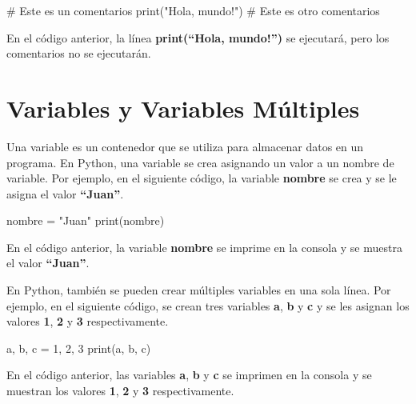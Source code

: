 \documentclass[
  a4paper,
  DIV=11,
  numbers=noendperiod,
  onepage,
  openany]{scrreprt}
\newenvironment{Shaded}{\begin{snugshade}}{\end{snugshade}}
\newcommand{\BuiltInTok}[1]{\textcolor[rgb]{0.00,0.23,0.31}{#1}}
\newcommand{\CommentTok}[1]{\textcolor[rgb]{0.37,0.37,0.37}{#1}}
\newcommand{\DecValTok}[1]{\textcolor[rgb]{0.68,0.00,0.00}{#1}}
\newcommand{\NormalTok}[1]{\textcolor[rgb]{0.00,0.23,0.31}{#1}}
\newcommand{\OperatorTok}[1]{\textcolor[rgb]{0.37,0.37,0.37}{#1}}
\newcommand{\StringTok}[1]{\textcolor[rgb]{0.13,0.47,0.30}{#1}}
\begin{document}
\begin{Shaded}
\begin{Highlighting}[]
\CommentTok{\# Este es un comentarios}
\BuiltInTok{print}\NormalTok{(}\StringTok{"Hola, mundo!"}\NormalTok{) }\CommentTok{\# Este es otro comentarios}
\end{Highlighting}
\end{Shaded}

En el código anterior, la línea \textbf{print(``Hola, mundo!'')} se
ejecutará, pero los comentarios no se ejecutarán.

\section{Variables y Variables
Múltiples}\label{variables-y-variables-muxfaltiples}

Una variable es un contenedor que se utiliza para almacenar datos en un
programa. En Python, una variable se crea asignando un valor a un nombre
de variable. Por ejemplo, en el siguiente código, la variable
\textbf{nombre} se crea y se le asigna el valor \textbf{``Juan''}.

\begin{Shaded}
\begin{Highlighting}[]
\NormalTok{nombre }\OperatorTok{=} \StringTok{"Juan"}
\BuiltInTok{print}\NormalTok{(nombre)}
\end{Highlighting}
\end{Shaded}

En el código anterior, la variable \textbf{nombre} se imprime en la
consola y se muestra el valor \textbf{``Juan''}.

En Python, también se pueden crear múltiples variables en una sola
línea. Por ejemplo, en el siguiente código, se crean tres variables
\textbf{a}, \textbf{b} y \textbf{c} y se les asignan los valores
\textbf{1}, \textbf{2} y \textbf{3} respectivamente.

\begin{Shaded}
\begin{Highlighting}[]
\NormalTok{a, b, c }\OperatorTok{=} \DecValTok{1}\NormalTok{, }\DecValTok{2}\NormalTok{, }\DecValTok{3}
\BuiltInTok{print}\NormalTok{(a, b, c)}
\end{Highlighting}
\end{Shaded}

En el código anterior, las variables \textbf{a}, \textbf{b} y \textbf{c}
se imprimen en la consola y se muestran los valores \textbf{1},
\textbf{2} y \textbf{3} respectivamente.
\end{document}

